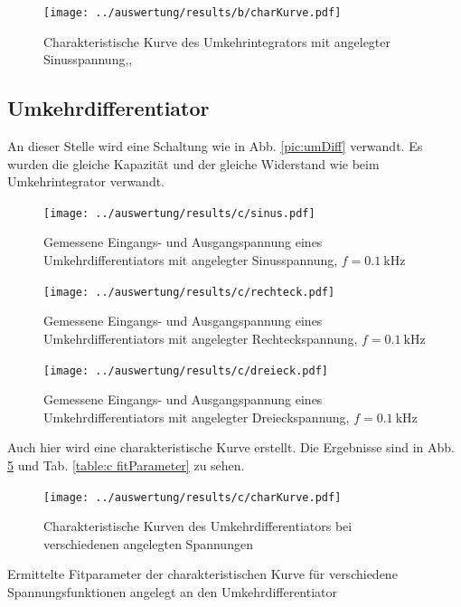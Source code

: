 \begin{figure}
	\centering
	\texttt{[image: ../auswertung/results/b/charKurve.pdf]}
	\caption{Charakteristische Kurve des Umkehrintegrators mit angelegter Sinusspannung,\protect, \protect }
	\label{pic:b charKurve}
\end{figure}

\subsection{Umkehrdifferentiator}
An dieser Stelle wird eine Schaltung wie in Abb. \ref{pic:umDiff} verwandt. Es wurden die gleiche Kapazität und der gleiche Widerstand wie beim Umkehrintegrator verwandt.

\begin{figure}
	\centering
	\texttt{[image: ../auswertung/results/c/sinus.pdf]}
	\caption{Gemessene Eingangs- und Ausgangspannung eines Umkehrdifferentiators mit angelegter Sinusspannung, $f = 0.1\ \si{\kilo\hertz}$}
	\label{pic:c sinus}
\end{figure}

\begin{figure}
	\centering
	\texttt{[image: ../auswertung/results/c/rechteck.pdf]}
	\caption{Gemessene Eingangs- und Ausgangspannung eines Umkehrdifferentiators mit angelegter Rechteckspannung, $f = 0.1\ \si{\kilo\hertz}$}
	\label{pic:c rechteck}
\end{figure}

\begin{figure}
	\centering
	\texttt{[image: ../auswertung/results/c/dreieck.pdf]}
	\caption{Gemessene Eingangs- und Ausgangspannung eines Umkehrdifferentiators mit angelegter Dreieckspannung, $f = 0.1\ \si{\kilo\hertz}$}
	\label{pic:c dreieck}
\end{figure}

Auch hier wird eine charakteristische Kurve erstellt. Die Ergebnisse sind in Abb. \ref{pic:c charKurve} und Tab. \ref{table:c fitParameter} zu sehen.

\begin{figure}
	\centering
	\texttt{[image: ../auswertung/results/c/charKurve.pdf]}
	\caption{Charakteristische Kurven des Umkehrdifferentiators bei verschiedenen angelegten Spannungen}
	\label{pic:c charKurve}
\end{figure}

\begin{table}
	\centering
	
	\caption{Ermittelte Fitparameter der charakteristischen Kurve für verschiedene Spannungsfunktionen angelegt an den Umkehrdifferentiator}
	\label{table:c fitParameter}
\end{table}

